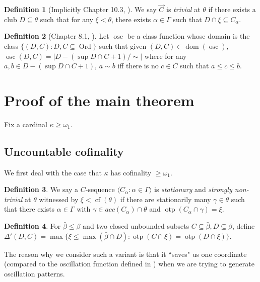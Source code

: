 \documentclass[12pt]{amsart}
\theoremstyle{definition}
\newtheorem{definition}{Definition}[section]
\theoremstyle{plain}
\theoremstyle{plain}
\DeclareMathOperator{\cf}{cf}
\DeclareMathOperator{\otp}{otp}
\DeclareMathOperator{\dom}{dom}
\DeclareMathOperator{\Ord}{Ord}
\DeclareMathOperator{\osc}{osc}
\begin{document}
\begin{definition}[Implicitly Chapter 10.3, \cite{walksbook}]\label{def: trivialCseq}
We say $\vec{C}$ is \emph{trivial} at $\theta$ if there exists a club $D\subseteq \theta$ such that for any $\xi<\theta$, there exists $\alpha\in \Gamma$ such that $D\cap \xi \subseteq C_\alpha$.
\end{definition}



\begin{definition}[Chapter 8.1, \cite{walksbook}]
Let $\osc$ be a class function whose domain is the class $\{(D,C): D,C\subseteq \Ord\}$ such that given $(D,C)\in \dom(\osc)$, $\osc(D,C)= |D- (\sup D\cap C+1) / \sim|$ where for any $a,b\in D- (\sup D\cap C+1)$, $a\sim b$ iff there is no $c\in C$ such that $a\leq c \leq b$.

\end{definition}


\section{Proof of the main theorem}
Fix a cardinal $\kappa\geq \omega_1$.
	\subsection{Uncountable cofinality}
	We first deal with the case that $\kappa$ has cofinality $\geq \omega_1$. 
	
	
	\begin{definition}
We say a $C$-sequence $\langle C_\alpha: \alpha\in \Gamma\rangle$ is \emph{stationary} and \emph{strongly non-trivial} at $\theta$ witnessed by $\xi<\cf(\theta)$ if there are stationarily many $\gamma \in \theta$ such that there exists $\alpha\in \Gamma$ with $\gamma\in acc(C_\alpha)\cap \theta$ and $\otp(C_\alpha\cap \gamma)=\xi$.
\end{definition}

	
	\begin{definition}\label{def: deltaprime}
For $\bar{\beta}\leq \beta$ and two closed unbounded subsets $C\subseteq \bar{\beta}, D\subseteq \beta$, define $\Delta'(D,C)=\max\{\xi \leq   \max (\bar{\beta} \cap D): \otp(C\cap \xi) = \otp(D\cap \xi)\}$. 
\end{definition}

The reason why we consider such a variant is that it ``saves" us one coordinate (compared to the oscillation function defined in \cite{Todorcevic3D}) when we are trying to generate oscillation patterns.
\end{document}
